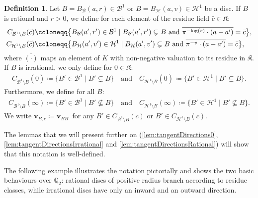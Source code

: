 \documentclass[10pt]{article}
\theoremstyle{definition}
\newtheorem{definition}[theorem]{Definition}
\def\log{{\rm log}}
\newcommand{\QQ}{\mathbb{Q}}
\renewcommand{\vec}[1]{\mathbf{#1}}
\begin{document}
\begin{definition}
  \label{def:tangentDirectionResidueField}
  Let $B=B_{\mathcal{B}}(a,r)\in\mathcal B^1$ or $B=B_{\mathcal{H}}(a,v)\in\mathcal H^1$ be a disc.  If $B$ is rational and $r>0$, we define for each element of the residue field $\bar c\in\mathfrak K$:
  \begin{align*}
    C_{\mathcal B^1\setminus B}(\bar c)&\coloneqq
    \big\{B_{\mathcal{B}}(a',r')\in \mathcal B^1 \mid B_{\mathcal{B}}(a',r')\subsetneq B \text{ and } \overline{\pi^{-\log(r)}\cdot (a-a')}=\bar c \big\},\\
    C_{\mathcal H^1\setminus B}(\bar c)&\coloneqq
    \big\{B_{\mathcal{H}}(a',v')\in \mathcal H^1 \mid B_{\mathcal{H}}(a',v')\subsetneq B \text{ and } \overline{\pi^{-v}\cdot (a-a')}=\bar c \big\},
  \end{align*}
  where $\overline{(\cdot)}$ maps an element of $K$ with non-negative valuation to its residue in $\mathfrak K$.
  If $B$ is irrational, we only define for $0\in\mathfrak K$:
  \begin{align*}
    C_{\mathcal B^1\setminus B}(\bar 0)\coloneqq
    \big\{B'\in \mathcal B^1 \mid B' \subsetneq B \big\}\quad\text{and}\quad
    C_{\mathcal H^1\setminus B}(\bar 0)\coloneqq
    \big\{B' \in \mathcal H^1 \mid B'\subsetneq B \big\}.
  \end{align*}  
  Furthermore, we define for all $B$:
  \begin{align*}
    C_{\mathcal B^1\setminus B}(\infty)\coloneqq
    \big\{B'\in \mathcal B^1 \mid B' \nsubseteq B \big\}\quad\text{and}\quad
    C_{\mathcal H^1\setminus B}(\infty)\coloneqq
    \big\{B' \in \mathcal H^1 \mid B'\nsubseteq B \big\}.
  \end{align*}
  We write \(\vec{v}_{B,c}\coloneqq \vec{v}_{BB'}\) for any \(B'\in C_{\mathcal B^1\setminus B}(c)\) or \(B'\in C_{\mathcal H^1\setminus B}(c)\).
  
\end{definition}

The lemmas that we will present further on (\cref{lem:tangentDirections0}, \ref{lem:tangentDirectionsIrrational} and \ref{lem:tangentDirectionsRational}) will show that this notation is well-defined.

The following example illustrates the notation pictorially and shows the two basic behaviours over $\QQ_2$: rational discs of positive radius branch according to residue classes, while irrational discs have only an inward and an outward direction.
\end{document}
